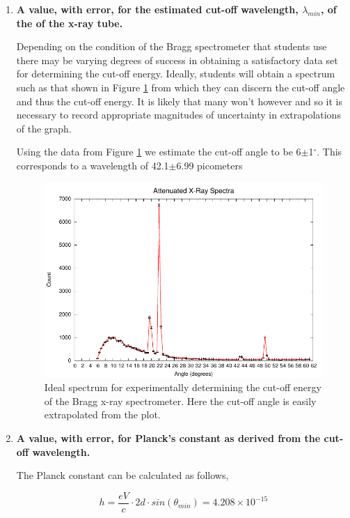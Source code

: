 \documentclass[justified]{tufte-book}
\begin{document}
\begin{enumerate}
\item {\bf A value, with error, for the estimated cut-off wavelength, $\lambda_{min}$, of the of the x-ray tube.}\newline

Depending on the condition of the Bragg spectrometer that students use there may be varying degrees of success in obtaining a satisfactory data set for determining the cut-off energy. Ideally, students will obtain a spectrum such as that shown in Figure \ref{fig:xrcg4} from which they can discern the cut-off angle and thus the cut-off energy. It is likely that many won't however and so it is necessary to record appropriate magnitudes of uncertainty in extrapolations of the graph. 

Using the data from Figure \ref{fig:xrcg4} we estimate the cut-off angle to be 6$\pm$1$^{\circ}$. This corresponds to a wavelength of 42.1$\pm$6.99 picometers

\begin{figure}
\includegraphics{HugoData-Angle.pdf}
\caption{Ideal spectrum for experimentally determining the cut-off energy of the Bragg x-ray spectrometer. Here the cut-off angle is easily extrapolated from the plot.}
\label{fig:xrcg4}
\end{figure}

\item {\bf A value, with error, for Planck's constant as derived from the cut-off wavelength.}\newline

The Planck constant can be calculated as follows,

\begin{equation}
h=\dfrac{eV}{c}\cdot 2d\cdot sin(\theta_{min})=4.208\times10^{-15}
\label{equ:twcg3}
\end{equation}


\end{enumerate}
\end{document}
